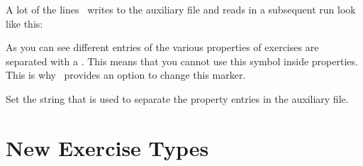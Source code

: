 \documentclass{xsim-manual}
\begin{document}
\begin{bewareofthedog}
  \xsimauxfileinfo
\end{bewareofthedog}

\begin{bewareofthedog}
  A lot of the lines \xsim\ writes to the auxiliary file and reads in a
  subsequent run look like this:
\begin{sourcecode}
\end{sourcecode}
  As you can see different entries of the various properties of exercises are
  separated with a \code{|}.  This means that you cannot use this symbol
  inside properties.  This is why \xsim\ provides an option to change this
  marker.
\end{bewareofthedog}
\begin{options}
  \Default{\code{|}}
    Set the string that is used to separate the property
    entries in the auxiliary file.
\end{options}

\section{New Exercise Types}\label{sec:new-exercise-types}
\end{document}
